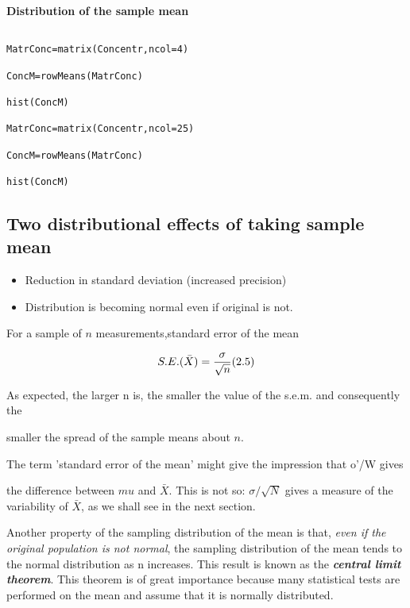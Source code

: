  

\textbf{Distribution of the sample mean}

\begin{verbatim}

MatrConc=matrix(Concentr,ncol=4)

ConcM=rowMeans(MatrConc)

hist(ConcM)

MatrConc=matrix(Concentr,ncol=25)

ConcM=rowMeans(MatrConc)

hist(ConcM)

\end{verbatim}

 

\subsection{Two distributional effects of taking sample mean}

\begin{itemize}

\item Reduction in standard deviation (increased precision)

\item Distribution is becoming normal even if original is not.

\end{itemize}

For a sample of $n$ measurements,standard error of the mean

\[S.E.(\bar{X}) = {\sigma \over \sqrt{n}} (2.5)\]

 

As expected, the larger n is, the smaller the value of the s.e.m. and consequently the

smaller the spread of the sample means about $n$.

The term 'standard error of the mean' might give the impression that o'/W gives

the difference between $mu$ and $\bar{X}$. This is not so: $\sigma / \sqrt{N}$ gives a measure of the variability of $\bar{X}$, as we shall see in the next section.

 

Another property of the sampling distribution of the mean is that, \emph{even if the original population is not normal}, the sampling distribution of the mean tends to the normal distribution as n increases. This result is known as the \emph{\textbf{central limit theorem}}. This theorem is of great importance because many statistical tests are performed on the mean and assume that it is normally distributed.

